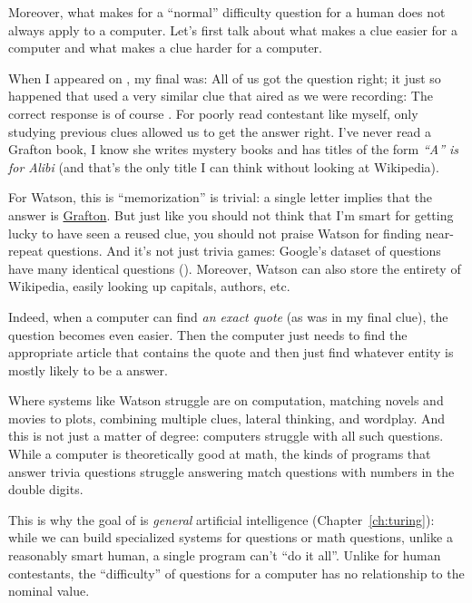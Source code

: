 Moreover, what makes for a ``normal'' difficulty question for a human
does not always apply to a computer.
%
Let's first talk about what makes a clue easier for a computer and what makes a clue harder for a computer.

When I appeared on \jeopardyp{}, my final \jeopardy{} was:
%
%
All of us got the question right; it just so happened that \jeopardy{}
used a very similar clue that aired as we were recording:
%
%
The correct response is of course .
%
For poorly read contestant like myself, only studying previous clues
allowed us to get the answer right.
%
I've never read a Grafton book, I know she writes mystery books and
has titles of the form \textit{``A'' is for Alibi} (and that's the
only title I can think without looking at Wikipedia).

For Watson, this is ``memorization'' is trivial: a single letter
implies that the answer is \underline{Grafton}.
%
But just like you should not think that I'm smart for getting lucky to
have seen a reused clue, you should not praise Watson for finding
near-repeat questions.
%
And it's not just trivia games: Google's dataset of questions have
many identical questions ().
%
Moreover, Watson can also store the entirety of Wikipedia, easily
looking up capitals, authors, etc.

Indeed, when a computer can find \emph{an exact quote} (as was in my
final \jeopardy{} clue), the question becomes even easier.
%
Then the computer just needs to find the appropriate article that
contains the quote and then just find whatever entity is mostly likely
to be a \jeopardyp{} answer.

Where systems like Watson struggle are on computation, matching novels
and movies to plots, combining multiple clues, lateral thinking, and
wordplay.
%
And this is not just a matter of degree: computers struggle with all
such questions.
%
While a computer is theoretically good at math, the kinds of programs
that answer trivia questions struggle answering match questions with
numbers in the double digits.

This is why the goal of  is \emph{general} artificial
intelligence (Chapter~\ref{ch:turing}): while we can build specialized
systems for \jeopardy{} questions or math questions, unlike a
reasonably smart human, a single program can't ``do it all''.
%
Unlike for human contestants, the ``difficulty'' of \jeopardy{}
questions for a computer has no relationship to the nominal value.

